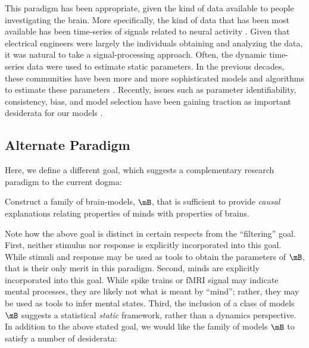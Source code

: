 This paradigm has been appropriate, given the kind of data available to people investigating the brain.  More specifically, the kind of data that has been most available has been time-series of signals related to neural activity \cite{}.  Given that electrical engineers were largely the individuals obtaining and analyzing the data, it was natural to take a signal-processing approach.  Often, the dynamic time-series data were used to estimate static parameters.  In the previous decades, these communities have been more and more sophisticated models and algorithms to estimate these parameters \cite{}.  Recently, issues such as parameter identifiability, consistency, bias, and model selection have been gaining traction as important desiderata for our models \cite{}.  

\subsection{Alternate Paradigm}

Here, we define a different goal, which suggests a complementary research paradigm to the current dogma: %

\begin{goal}
	Construct a family of brain-models, $\mB$, that is sufficient to provide \emph{causal} explanations relating properties of minds with properties of brains.
\end{goal}

Note how the above goal is distinct in certain respects from the ``filtering'' goal.  First, neither stimulus nor response is explicitly incorporated into this goal.  While stimuli and response may be used as tools to obtain the parameters of $\mB$, that is their only merit in this paradigm.  Second, minds are explicitly incorporated into this goal.  While spike trains or fMRI signal may indicate mental processes, they are likely not what is meant by ``mind''; rather, they may be used as tools to infer mental states.  Third, the inclusion of a class of models $\mB$  suggests a statistical \emph{static} framework, rather than a dynamics perspective.  In addition to the above stated goal, we would like the family of models $\mB$ to satisfy a number of desiderata:

